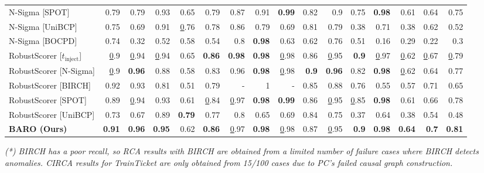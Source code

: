 \begin{table}[]
{\begin{tabular}{l|rrrrr|rrrrr|rrrrr}
N-Sigma {[}SPOT{]} & 0.79 & 0.79 & 0.93 & 0.65 & 0.79 & 0.87 & 0.91 & \textbf{0.99} & 0.82 & 0.9 & 0.75 & \textbf{0.98} & 0.61 & 0.64 & 0.75 \\
N-Sigma {[}UniBCP{]} & 0.75 & 0.69 & 0.91 & {\ul 0.76} & 0.78 & 0.86 & 0.79 & 0.69 & 0.81 & 0.79 & 0.38 & 0.71 & 0.38 & 0.62 & 0.52 \\
N-Sigma {[}BOCPD{]} & 0.74 & 0.32 & 0.52 & 0.58 & 0.54 & 0.8 & \textbf{0.98} & 0.63 & 0.62 & 0.76 & 0.51 & 0.16 & 0.29 & 0.22 & 0.3 \\ \hline 
RobustScorer {[}$t_{\text{inject}}${]} & {\ul 0.9} & {\ul 0.94} & {\ul 0.94} & 0.65 & \textbf{0.86} & \textbf{0.98} & \textbf{0.98} & {\ul 0.98} & 0.86 & {\ul 0.95} & \textbf{0.9} & {\ul 0.97} & {\ul 0.62} & {\ul 0.67} & {\ul 0.79} \\
RobustScorer {[}N-Sigma{]} & {\ul 0.9} & \textbf{0.96} & 0.88 & 0.58 & 0.83 & 0.96 & \textbf{0.98} & {\ul 0.98} & \textbf{0.9} & \textbf{0.96} & 0.82 & \textbf{0.98} & {\ul 0.62} & 0.64 & 0.77 \\
RobustScorer {[}BIRCH{]} & 0.92 & 0.93 & 0.81 & 0.51 & 0.79 & - & 1 & - & 0.85 & 0.88 & 0.76 & 0.55 & 0.57 & 0.71 & 0.65 \\
RobustScorer {[}SPOT{]} & 0.89 & {\ul 0.94} & 0.93 & 0.61 & {\ul 0.84} & {\ul 0.97} & \textbf{0.98} & \textbf{0.99} & 0.86 & {\ul 0.95} & {\ul 0.85} & \textbf{0.98} & 0.61 & 0.66 & 0.78 \\
RobustScorer {[}UniBCP{]} & 0.73 & 0.67 & 0.89 & \textbf{0.79} & 0.77 & 0.8 & 0.65 & 0.69 & 0.84 & 0.75 & 0.37 & 0.64 & 0.38 & 0.54 & 0.48 \\ \hline
\textbf{BARO (Ours)} & \textbf{0.91} & \textbf{0.96} & \textbf{0.95} & 0.62 & \textbf{0.86} & {\ul 0.97} & \textbf{0.98} & {\ul 0.98} & 0.87 & {\ul 0.95} & \textbf{0.9} & \textbf{0.98} & \textbf{0.64} & \textbf{0.7} & \textbf{0.81} \\ \hline
\end{tabular}%
}

{\footnotesize \textit{(*) BIRCH has a poor recall, so RCA results with BIRCH are obtained from a limited number of failure cases where BIRCH detects anomalies.
CIRCA results for TrainTicket are only obtained from 15/100 cases due to PC's failed causal graph construction.
}}
\vspace{-0.3cm}
\end{table}



